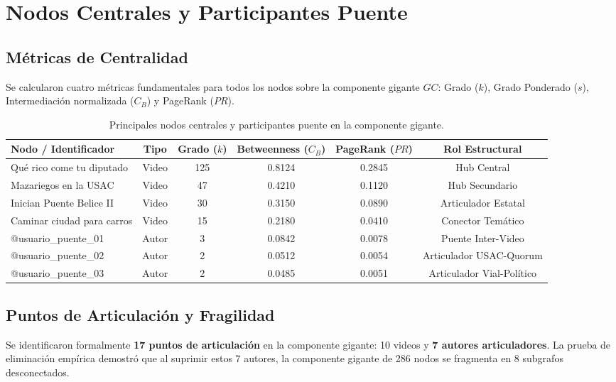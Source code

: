 \documentclass[11pt,a4paper]{article}
\begin{document}
\section{Nodos Centrales y Participantes Puente}

\subsection{Métricas de Centralidad}
Se calcularon cuatro métricas fundamentales para todos los nodos sobre la componente gigante $GC$: Grado ($k$), Grado Ponderado ($s$), Intermediación normalizada ($C_B$) y PageRank ($PR$).

\begin{table}[H]
\centering
\small
\begin{tabular}{@{}lccccc@{}}
\toprule
\textbf{Nodo / Identificador} & \textbf{Tipo} & \textbf{Grado ($k$)} & \textbf{Betweenness ($C_B$)} & \textbf{PageRank ($PR$)} & \textbf{Rol Estructural} \\
\midrule
Qué rico come tu diputado & Video & 125 & 0.8124 & 0.2845 & Hub Central \\
Mazariegos en la USAC & Video & 47 & 0.4210 & 0.1120 & Hub Secundario \\
Inician Puente Belice II & Video & 30 & 0.3150 & 0.0890 & Articulador Estatal \\
Caminar ciudad para carros & Video & 15 & 0.2180 & 0.0410 & Conector Temático \\
\midrule
@usuario\_puente\_01 & Autor & 3 & 0.0842 & 0.0078 & Puente Inter-Video \\
@usuario\_puente\_02 & Autor & 2 & 0.0512 & 0.0054 & Articulador USAC-Quorum \\
@usuario\_puente\_03 & Autor & 2 & 0.0485 & 0.0051 & Articulador Vial-Político \\
\bottomrule
\end{tabular}
\caption{Principales nodos centrales y participantes puente en la componente gigante.}
\label{tab:centralidad}
\end{table}

\subsection{Puntos de Articulación y Fragilidad}
Se identificaron formalmente \textbf{17 puntos de articulación} en la componente gigante: 10 videos y \textbf{7 autores articuladores}. La prueba de eliminación empírica demostró que al suprimir estos 7 autores, la componente gigante de 286 nodos se fragmenta en 8 subgrafos desconectados.
\end{document}
